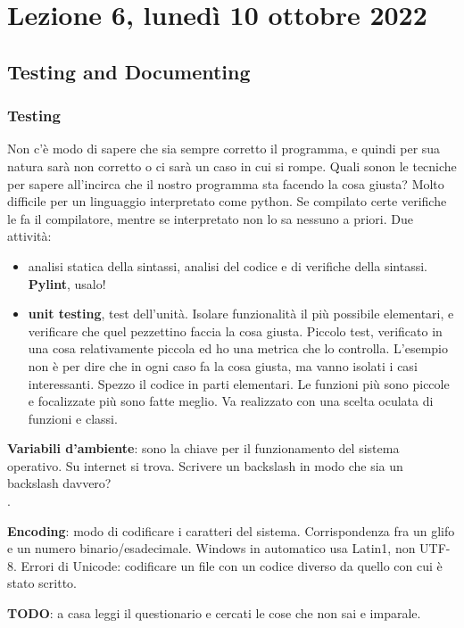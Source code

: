 \documentclass[10pt, a4paper, titlepage]{book}
\begin{document}
\section{Lezione 6, lunedì 10 ottobre 2022}

\subsection{Testing and Documenting}

\subsubsection{Testing}

Non c'è modo di sapere che sia sempre corretto il programma, e quindi per sua natura sarà non corretto o ci sarà un caso in cui si rompe.
Quali sonon le tecniche per sapere all'incirca che il nostro programma sta facendo la cosa giusta?
Molto difficile per un linguaggio interpretato come python. Se compilato certe verifiche le fa il compilatore, mentre se interpretato non lo sa nessuno a priori.
Due attività:
\begin{itemize}
	\item analisi statica della sintassi, analisi del codice e di verifiche della sintassi. \textbf{Pylint}, usalo!
	\item \textbf{unit testing}, test dell'unità. Isolare funzionalità il più possibile elementari, e verificare che quel pezzettino faccia la cosa giusta. Piccolo test, verificato in una cosa relativamente piccola ed ho una metrica che lo controlla. L'esempio non è per dire che in ogni caso fa la cosa giusta, ma vanno isolati i casi interessanti. Spezzo il codice in parti elementari. Le funzioni più sono piccole e focalizzate più sono fatte meglio. Va realizzato con una scelta oculata di funzioni e classi.
\end{itemize}

\textbf{Variabili d'ambiente}: sono la chiave per il funzionamento del sistema operativo. Su internet si trova. Scrivere un backslash in modo che sia un backslash davvero? \texttt{\\}.

\textbf{Encoding}: modo di codificare i caratteri del sistema. Corrispondenza fra un glifo e un numero binario/esadecimale. Windows in automatico usa Latin1, non UTF-8. Errori di Unicode: codificare un file con un codice diverso da quello con cui è stato scritto.

\textbf{TODO}: a casa leggi il questionario e cercati le cose che non sai e imparale.
\end{document}
